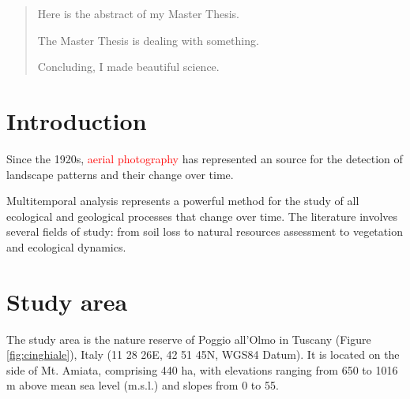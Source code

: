 \tableofcontents  %

\begin{abstract}
Here is the abstract of my Master Thesis.

The Master Thesis is dealing with something.

Concluding, I made beautiful science.
\end{abstract}


\section{Introduction}


Since the 1920s, \textcolor{red}{aerial photography} has represented an  source for the detection of landscape patterns and their change over time.

Multitemporal analysis represents a powerful method for the study of all ecological and geological processes that change over time. The literature involves several fields of study: from soil loss to natural resources assessment to vegetation and ecological dynamics.


\section{Study area}

The study area is the nature reserve of Poggio all’Olmo in Tuscany (Figure \ref{fig:cinghiale}), Italy (11 28 26E, 42 51 45N, WGS84 Datum). It is located on the side of Mt. Amiata, comprising 440 ha, with elevations ranging from 650 to 1016 m above mean sea level (m.s.l.) and slopes from 0 to 55.


